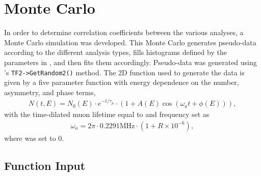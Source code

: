 
\graphicspath{{Body/Figures/EvW/}{Body/Figures/GoodnessOfFit/}}

\section{Monte Carlo}


In order to determine correlation coefficients between the various analyses, a Monte Carlo simulation was developed. This Monte Carlo generates pseudo-data according to the different analysis types, fills histograms defined by the parameters in , and then fits them accordingly. Pseudo-data was generated using \ROOT's \texttt{TF2->GetRandom2()} method. The 2D function used to generate the data is given by a five parameter function with energy dependence on the number, asymmetry, and phase terms,
\begin{align}
	N(t, E) = N_{0}(E) \cdot e^{-t/\tau_{\mu}} \cdot (1 + A(E) \cos{(\omega_{a}t + \phi(E))}),
\label{eq:2dfunc}
\end{align}
with the time-dilated muon lifetime \taumu equal to  and \gmtwo frequency \wa set as
\begin{align}
	\omega_{a} = 2\pi \cdot 0.2291 \text{MHz} \cdot (1 + R \times 10^{-6}),
\end{align}
where \R was set to 0. 


\subsection{Function Input}


